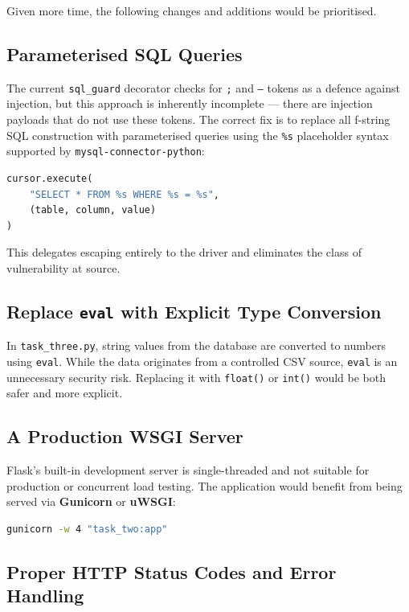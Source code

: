 \documentclass[12pt,a4paper]{article}
\begin{document}
Given more time, the following changes and additions would be prioritised.

\subsection{Parameterised SQL Queries}

The current \texttt{sql\_guard} decorator checks for \texttt{;} and \texttt{--}
tokens as a defence against injection, but this approach is inherently
incomplete --- there are injection payloads that do not use these tokens. The
correct fix is to replace all f-string SQL construction with parameterised
queries using the \texttt{\%s} placeholder syntax supported by
\texttt{mysql-connector-python}:

\begin{lstlisting}[language=python, caption={Parameterised query example}]
cursor.execute(
    "SELECT * FROM %s WHERE %s = %s",
    (table, column, value)
)
\end{lstlisting}

This delegates escaping entirely to the driver and eliminates the class of
vulnerability at source.

\subsection{Replace \texttt{eval} with Explicit Type Conversion}

In \texttt{task\_three.py}, string values from the database are converted to
numbers using \texttt{eval}. While the data originates from a controlled CSV
source, \texttt{eval} is an unnecessary security risk. Replacing it with
\texttt{float()} or \texttt{int()} would be both safer and more explicit.

\subsection{A Production WSGI Server}

Flask's built-in development server is single-threaded and not suitable for
production or concurrent load testing. The application would benefit from being
served via \textbf{Gunicorn} or \textbf{uWSGI}:

\begin{lstlisting}[language=bash, caption={Running with Gunicorn}]
gunicorn -w 4 "task_two:app"
\end{lstlisting}

\subsection{Proper HTTP Status Codes and Error Handling}
\end{document}
